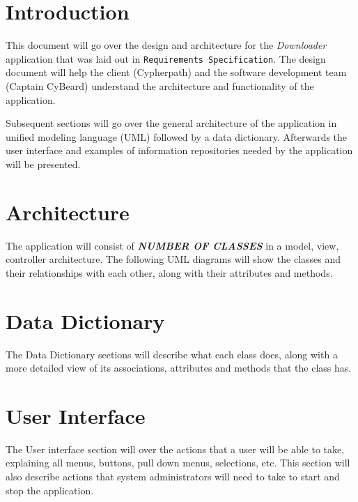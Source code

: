 \documentclass{article}
\title{}
\author{}
\date{}
\begin{document}



\tableofcontents
\newpage
\listoffigures
\newpage

\begin{versionhistory}
\end{versionhistory}
\newpage

\section{Introduction}
This document will go over the design and architecture for the \textit{Downloader} application that was laid out in
\texttt{Requirements Specification}\cite{reqs}. The design document will help the client (Cypherpath) and the
software development team (Captain CyBeard) understand the architecture and functionality of the application.

Subsequent sections will go over the general architecture of the application in unified modeling language
(UML) followed by a data dictionary. Afterwards the user interface and examples of information repositories needed
by the application will be presented.

\section{Architecture}
The application will consist of \textbf{\textit{NUMBER OF CLASSES}} in a model, view, controller architecture. The following
UML diagrams will show the classes and their relationships with each other, along with their attributes and methods.


\section{Data Dictionary}
The Data Dictionary sections will describe what each class does, along with a more detailed view of its
associations, attributes and methods that the class has.





\section{User Interface}
The User interface section will over the actions that a user will be able to take, explaining all menus, buttons,
pull down menus, selections, etc. This section will also describe actions that system administrators will need to
take to start and stop the application.
\end{document}
